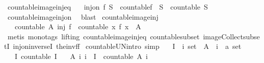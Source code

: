 \begin{isabellebody}
\endisatagproof
{\isafoldproof}%
%
\isadelimproof
\isanewline
%
\endisadelimproof
\isanewline
{}\isamarkupfalse%
\ countable{\isacharunderscore}image{\isacharunderscore}inj{\isacharunderscore}eq{\isacharcolon}\isanewline
\ \ \ {\isachardoublequoteopen}inj{\isacharunderscore}on\ f\ S\ {\isasymLongrightarrow}\ countable{\isacharparenleft}f\ {\isacharbackquote}\ S{\isacharparenright}\ {\isasymlongleftrightarrow}\ countable\ S{\isachardoublequoteclose}\isanewline
%
\isadelimproof
\ \ %
\endisadelimproof
%
\isatagproof
{}\isamarkupfalse%
\ countable{\isacharunderscore}image{\isacharunderscore}inj{\isacharunderscore}on\ \isamarkupfalse%
\ blast%
\endisatagproof
{\isafoldproof}%
%
\isadelimproof
\isanewline
%
\endisadelimproof
\isanewline
{}\isamarkupfalse%
\ countable{\isacharunderscore}image{\isacharunderscore}inj{\isacharcolon}\isanewline
\ \ \ {\isachardoublequoteopen}{\isasymlbrakk}countable\ A{\isacharsemicolon}\ inj\ f{\isasymrbrakk}\ {\isasymLongrightarrow}\ countable\ {\isacharbraceleft}x{\isachardot}\ f\ x\ {\isasymin}\ A{\isacharbraceright}{\isachardoublequoteclose}\isanewline
%
\isadelimproof
\ \ %
\endisadelimproof
%
\isatagproof
{}\isamarkupfalse%
\ {\isacharparenleft}metis\ {\isacharparenleft}mono{\isacharunderscore}tags{\isacharcomma}\ lifting{\isacharparenright}\ countable{\isacharunderscore}image{\isacharunderscore}inj{\isacharunderscore}eq\ countable{\isacharunderscore}subset\ image{\isacharunderscore}Collect{\isacharunderscore}subsetI\ inj{\isacharunderscore}on{\isacharunderscore}inverseI\ the{\isacharunderscore}inv{\isacharunderscore}f{\isacharunderscore}f{\isacharparenright}%
\endisatagproof
{\isafoldproof}%
%
\isadelimproof
\isanewline
%
\endisadelimproof
\isanewline
{}\isamarkupfalse%
\ countable{\isacharunderscore}UN{\isacharbrackleft}intro{\isacharcomma}\ simp{\isacharbrackright}{\isacharcolon}\isanewline
\ \ \ I\ {\isacharcolon}{\isacharcolon}\ {\isachardoublequoteopen}{\isacharprime}i\ set{\isachardoublequoteclose}\ \ A\ {\isacharcolon}{\isacharcolon}\ {\isachardoublequoteopen}{\isacharprime}i\ {\isacharequal}{\isachargreater}\ {\isacharprime}a\ set{\isachardoublequoteclose}\isanewline
\ \ \ I{\isacharcolon}\ {\isachardoublequoteopen}countable\ I{\isachardoublequoteclose}\isanewline
\ \ \ A{\isacharcolon}\ {\isachardoublequoteopen}{\isasymAnd}i{\isachardot}\ i\ {\isasymin}\ I\ {\isasymLongrightarrow}\ countable\ {\isacharparenleft}A\ i{\isacharparenright}{\isachardoublequoteclose}\isanewline

\end{isabellebody}
